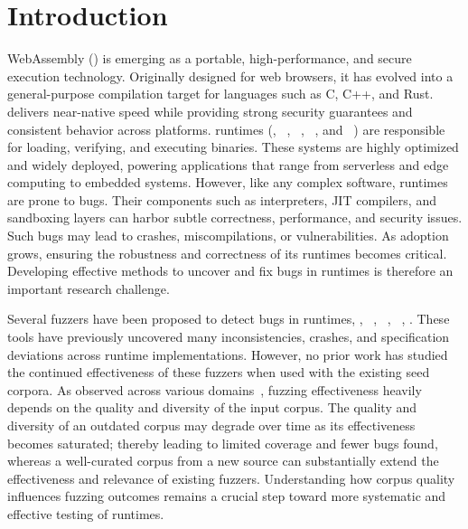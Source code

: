 \documentclass[lettersize,journal]{IEEEtran}
\begin{document}
\section{Introduction}
\label{sec:intro}

\sloppy
WebAssembly (\wasm{}) is emerging as a portable, high-performance, and secure execution technology. Originally designed for web browsers, it has evolved into a general-purpose compilation target for languages such as C, C++, and Rust. \wasm{} delivers near-native speed while providing strong security guarantees and consistent behavior across platforms. \wasm{} runtimes (\eg{},  \wasmtime{}~\cite{wasmtime}, \wasmer{}~\cite{wasmer}, \wamr{}~\cite{wamr}, and \wasmedge{}~\cite{wasmedge}) are responsible for loading, verifying, and executing \wasm{} binaries. These systems are highly optimized and widely deployed, powering applications that range from serverless and edge computing to embedded systems. However, like any complex software, \wasm{} runtimes are prone to bugs. Their components such as interpreters, JIT compilers, and sandboxing layers can harbor subtle correctness, performance, and security issues. Such bugs may lead to crashes, miscompilations, or vulnerabilities. As \wasm{} adoption grows, ensuring the robustness and correctness of its runtimes becomes critical. 
Developing effective methods to uncover and fix bugs in \wasm{} runtimes is therefore an important research challenge.

Several fuzzers have been proposed to detect bugs in \wasm{} runtimes, \eg{}, \wadiff{}~\cite{zhou2023wadiff}, \wapplique{}~\cite{zhao2024wapplique}, \wasmaker{}~\cite{cao2024wasmaker}, . These tools have previously uncovered many inconsistencies, crashes, and specification deviations across runtime implementations. However, no prior work has studied the continued effectiveness of these fuzzers when used with the existing seed corpora. As observed across various domains~\cite{miller1990empirical,xu2020krace,lyu2018smartseed,bohme2017markov,manes2019survey}, fuzzing effectiveness heavily depends on the quality and diversity of the input corpus. The quality and diversity of an outdated corpus may degrade over time as its effectiveness becomes saturated; thereby leading to limited coverage and fewer bugs found, whereas a well-curated corpus from a new source can substantially extend the effectiveness and relevance of existing fuzzers. Understanding how corpus quality influences \wasm{} fuzzing outcomes remains a crucial step toward more systematic and effective testing of \wasm{} runtimes.
%
\end{document}
